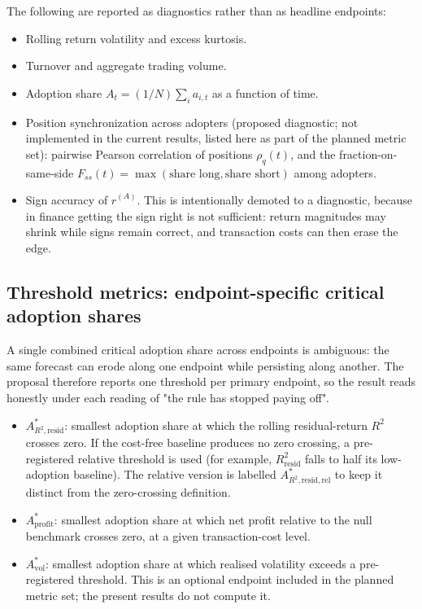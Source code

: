 \documentclass[11pt]{article}
\begin{document}
The following are reported as diagnostics rather than as headline endpoints:

\begin{itemize}[itemsep=0.2em]
  \item Rolling return volatility and excess kurtosis.
  \item Turnover and aggregate trading volume.
  \item Adoption share $A_t = (1/N) \sum_i a_{i,t}$ as a function of time.
  \item Position synchronization across adopters (proposed diagnostic; not implemented in the current results, listed here as part of the planned metric set): pairwise Pearson correlation of positions $\rho_q(t)$, and the fraction-on-same-side $F_{ss}(t) = \max(\text{share long}, \text{share short})$ among adopters.
  \item Sign accuracy of $\hat{r}^{(A)}$. This is intentionally demoted to a diagnostic, because in finance getting the sign right is not sufficient: return magnitudes may shrink while signs remain correct, and transaction costs can then erase the edge.
\end{itemize}

\subsection{Threshold metrics: endpoint-specific critical adoption shares}

A single combined critical adoption share across endpoints is ambiguous: the same forecast can erode along one endpoint while persisting along another. The proposal therefore reports one threshold per primary endpoint, so the result reads honestly under each reading of "the rule has stopped paying off".

\begin{itemize}[itemsep=0.2em]
  \item \textbf{$A^{*}_{R^{2},\mathrm{resid}}$}: smallest adoption share at which the rolling residual-return $R^{2}$ crosses zero. If the cost-free baseline produces no zero crossing, a pre-registered relative threshold is used (for example, $R^{2}_{\mathrm{resid}}$ falls to half its low-adoption baseline). The relative version is labelled $A^{*}_{R^{2},\mathrm{resid},\mathrm{rel}}$ to keep it distinct from the zero-crossing definition.
  \item \textbf{$A^{*}_{\mathrm{profit}}$}: smallest adoption share at which net profit relative to the null benchmark crosses zero, at a given transaction-cost level.
  \item \textbf{$A^{*}_{\mathrm{vol}}$}: smallest adoption share at which realised volatility exceeds a pre-registered threshold. This is an optional endpoint included in the planned metric set; the present results do not compute it.
\end{itemize}
\end{document}
